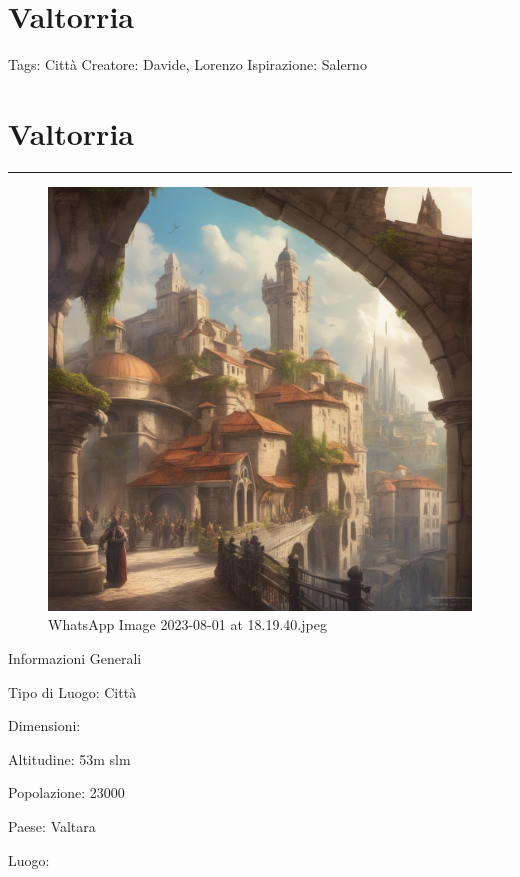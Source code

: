 \section{Valtorria}\label{valtorria}

Tags: Città Creatore: Davide, Lorenzo Ispirazione: Salerno

\section{Valtorria}\label{valtorria-1}

\begin{center}\rule{0.5\linewidth}{0.5pt}\end{center}

\begin{figure}
\centering
\includegraphics{WhatsApp_Image_2023-08-01_at_18.19.40.jpeg}
\caption{WhatsApp Image 2023-08-01 at 18.19.40.jpeg}
\end{figure}

Informazioni Generali

Tipo di Luogo: Città

Dimensioni:

Altitudine: 53m slm

Popolazione: 23000

Paese: Valtara

Luogo:

